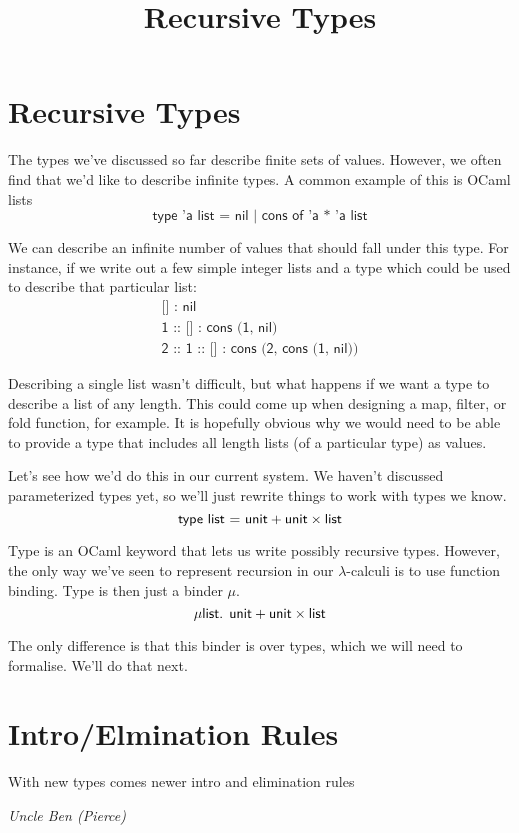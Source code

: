 \documentclass{lecturenotes}
\title{Recursive Types}
\newcommand{\utype}{\textsf{unit}\xspace}
\newcommand{\prodtype}[2]{\ensuremath{#1 \times #2}}
\newcommand{\sumtype}[2]{\ensuremath{#1 + #2}}
\begin{document}
\maketitle

\section{Recursive Types}
The types we've discussed so far describe finite sets of values.
However, we often find that we'd like to describe infinite types.
A common example of this is OCaml lists
\[
  \textsf{type 'a list = nil | cons of 'a * 'a list}
\]

\noindent We can describe an infinite number of values that should fall under this type.
For instance, if we write out a few simple integer lists and a type which could be used to describe that particular list:
\begin{gather*}
  \textsf{[] : nil}\\
  \textsf{1 :: [] : cons (1, nil)}\\
  \textsf{2 :: 1 :: [] : cons (2, cons (1, nil))}
\end{gather*}

Describing a single list wasn't difficult, but what happens if we want a type to describe a list of any length.
This could come up when designing a map, filter, or fold function, for example.
It is hopefully obvious why we would need to be able to provide a type that includes all length lists (of a particular type) as values.

Let's see how we'd do this in our current system.
We haven't discussed parameterized types yet, so we'll just rewrite things to work with types we know.
\[
  \textsf{type list = \sumtype{\utype}{\prodtype{\utype}{\textsf{list}}}}
\]

Type is an OCaml keyword that lets us write possibly recursive types.
However, the only way we've seen to represent recursion in our $\lambda$-calculi is to use function binding.
Type is then just a binder $\mu$.
\[
  \mu \textsf{list. \sumtype{\utype}{\prodtype{\utype}{\textsf{list}}}}
\]

The only difference is that this binder is over types, which we will need to formalise.
We'll do that next.

\section{Intro/Elmination Rules}
\epigraph{With new types comes newer intro and elimination rules}{\textit{Uncle Ben (Pierce)}}
\end{document}
